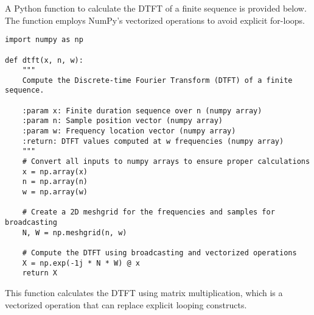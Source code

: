 
\item[(a)]
A Python function to calculate the DTFT of a finite sequence is provided below.
The function employs NumPy's vectorized operations to avoid explicit for-loops.

\begin{verbatim}
import numpy as np

def dtft(x, n, w):
    """
    Compute the Discrete-time Fourier Transform (DTFT) of a finite sequence.

    :param x: Finite duration sequence over n (numpy array)
    :param n: Sample position vector (numpy array)
    :param w: Frequency location vector (numpy array)
    :return: DTFT values computed at w frequencies (numpy array)
    """
    # Convert all inputs to numpy arrays to ensure proper calculations
    x = np.array(x)
    n = np.array(n)
    w = np.array(w)

    # Create a 2D meshgrid for the frequencies and samples for broadcasting
    N, W = np.meshgrid(n, w)

    # Compute the DTFT using broadcasting and vectorized operations
    X = np.exp(-1j * N * W) @ x
    return X
\end{verbatim}

This function calculates the DTFT using matrix multiplication, which is a vectorized operation
that can replace explicit looping constructs.
